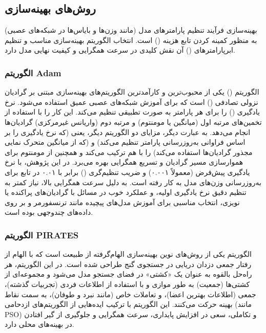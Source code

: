 \subsection{روش‌های بهینه‌سازی}
بهینه‌سازی فرآیند تنظیم پارامترهای مدل (مانند وزن‌ها و بایاس‌ها در شبکه‌های عصبی) به منظور کمینه کردن تابع هزینه () است. انتخاب الگوریتم بهینه‌سازی مناسب و تنظیم ابرپارامترهای () آن نقش کلیدی در سرعت همگرایی و کیفیت نهایی مدل دارد.

\subsubsection{الگوریتم Adam}
الگوریتم  () \cite{Kingma2015} یکی از محبوب‌ترین و کارآمدترین الگوریتم‌های بهینه‌سازی مبتنی بر گرادیان نزولی تصادفی () است که برای آموزش شبکه‌های عصبی عمیق استفاده می‌شود.  نرخ یادگیری () را برای هر پارامتر به صورت تطبیقی تنظیم می‌کند. این کار را با استفاده از تخمین‌های مرتبه اول (میانگین یا مومنتوم) و مرتبه دوم (واریانس غیرمرکزی) گرادیان‌ها انجام می‌دهد. به عبارت دیگر،  مزایای دو الگوریتم دیگر، یعنی  (که نرخ یادگیری را بر اساس فراوانی به‌روزرسانی پارامتر تنظیم می‌کند) و  (که از میانگین متحرک نمایی مجذور گرادیان‌ها استفاده می‌کند) را با هم ترکیب می‌کند و همچنین از مومنتوم برای هموارسازی مسیر گرادیان و تسریع همگرایی بهره می‌برد.
در این پژوهش،  با نرخ یادگیری پیش‌فرض (معمولاً ۰.۰۰۱) و ضریب تنظیم‌گری  () برابر با ۰.۰۱ در تابع  برای به‌روزرسانی وزن‌های مدل  به کار رفته است.  به دلیل سرعت همگرایی بالا، نیاز کمتر به تنظیم دقیق نرخ یادگیری اولیه، و عملکرد خوب در مسائل با گرادیان‌های پراکنده یا نویزی، انتخاب مناسبی برای آموزش مدل‌های پیچیده مانند ترنسفورمر و  بر روی داده‌های چندوجهی بوده است.

\subsubsection{الگوریتم PIRATES}
الگوریتم  یکی از روش‌های نوین بهینه‌سازی الهام‌گرفته از طبیعت است که با الهام از رفتار جمعی دزدان دریایی در جستجوی گنج طراحی شده است. در این الگوریتم، هر راه‌حل بالقوه به عنوان یک «کشتی» در فضای جستجو مدل می‌شود و مجموعه‌ای از کشتی‌ها (جمعیت) به طور موازی و با استفاده از اطلاعات فردی (تجربیات گذشته)، جمعی (اطلاعات بهترین اعضا)، و تعاملات خاص (مانند نبرد و طوفان)، به سمت نقاط بهینه حرکت می‌کنند. این الگوریتم با ترکیب ایده‌هایی از الگوریتم‌های ازدحامی (مانند PSO) و تکاملی، سعی در افزایش پایداری، سرعت همگرایی و جلوگیری از گیر افتادن در بهینه‌های محلی دارد.

